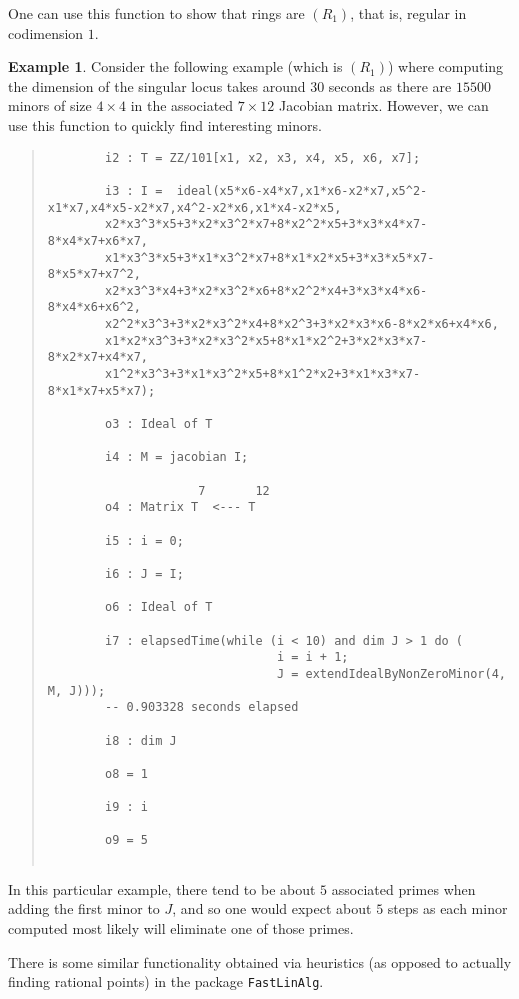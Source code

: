 \documentclass[11pt]{amsart}
\theoremstyle{definition}
\newtheorem{example}{Example}[section]
\begin{document}
One can use this function to show that rings are $(R_1)$, that is, regular in codimension $1$.

\begin{example}
    Consider the following example (which is $(R_1)$) where computing the dimension of the singular locus takes around $30$ seconds as there are $15500$ minors of size $4 \times 4$ in the associated $7 \times 12$ Jacobian matrix.  However, we can use this function to quickly find interesting minors.
  {{\small\color{blue}
  \begin{quote}
\begin{verbatim}
		i2 : T = ZZ/101[x1, x2, x3, x4, x5, x6, x7];
		
		i3 : I =  ideal(x5*x6-x4*x7,x1*x6-x2*x7,x5^2-x1*x7,x4*x5-x2*x7,x4^2-x2*x6,x1*x4-x2*x5,
		x2*x3^3*x5+3*x2*x3^2*x7+8*x2^2*x5+3*x3*x4*x7-8*x4*x7+x6*x7,
		x1*x3^3*x5+3*x1*x3^2*x7+8*x1*x2*x5+3*x3*x5*x7-8*x5*x7+x7^2,
		x2*x3^3*x4+3*x2*x3^2*x6+8*x2^2*x4+3*x3*x4*x6-8*x4*x6+x6^2,
		x2^2*x3^3+3*x2*x3^2*x4+8*x2^3+3*x2*x3*x6-8*x2*x6+x4*x6,
		x1*x2*x3^3+3*x2*x3^2*x5+8*x1*x2^2+3*x2*x3*x7-8*x2*x7+x4*x7,
		x1^2*x3^3+3*x1*x3^2*x5+8*x1^2*x2+3*x1*x3*x7-8*x1*x7+x5*x7);
		
		o3 : Ideal of T
		
		i4 : M = jacobian I;
		
		             7       12
		o4 : Matrix T  <--- T
		
		i5 : i = 0;
		
		i6 : J = I;
		
		o6 : Ideal of T
		
		i7 : elapsedTime(while (i < 10) and dim J > 1 do (
                                i = i + 1; 
                                J = extendIdealByNonZeroMinor(4, M, J)));
		-- 0.903328 seconds elapsed
		
		i8 : dim J
		
		o8 = 1
		
		i9 : i
		
		o9 = 5
		
\end{verbatim}
\end{quote}\vspace{-1em}    
    }}    
    \noindent
    In this particular example, there tend to be about $5$ associated primes when adding the first minor to $J$, and so one would expect about $5$ steps as each minor computed most likely will eliminate one of those primes.
\end{example} 

There is some similar functionality obtained via heuristics (as opposed to actually finding rational points) in the package {\tt FastLinAlg}.


\vspace{2em}
\end{document}
